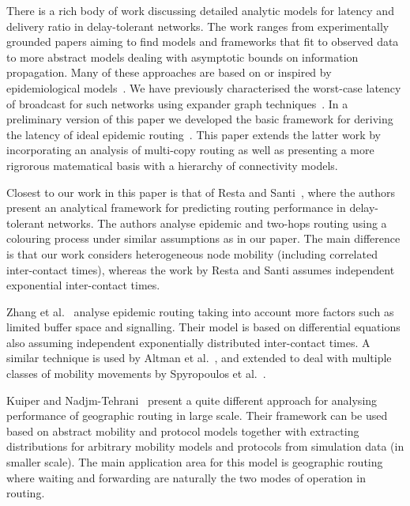 \documentclass{article}
\begin{document}
There is a rich body of work discussing detailed analytic models for
latency and delivery ratio in delay-tolerant networks. The work ranges
from experimentally grounded papers aiming to find models and
frameworks that fit to observed data to more abstract models dealing
with asymptotic bounds on information propagation. Many of these
approaches are based on or inspired by epidemiological
models~\cite{khelil02}. We have previously characterised the
worst-case latency of broadcast for such networks using expander graph
techniques~\cite{asplund12worst}. In a preliminary version of this
paper we developed the basic framework for deriving the latency of
ideal epidemic routing~\cite{asplund12analysing}. This paper extends
the latter work by incorporating an analysis of multi-copy routing as
well as presenting a more rigrorous matematical basis with a hierarchy
of connectivity models.


Closest to our work in this paper is that of Resta and
Santi~\cite{resta11}, where the authors present an analytical
framework for predicting routing performance in delay-tolerant
networks. The authors analyse epidemic and two-hops routing using a
colouring process under similar assumptions as in our paper. The main
difference is that our work considers heterogeneous node mobility
(including correlated inter-contact times), whereas the work by Resta and
Santi assumes independent exponential inter-contact times.

Zhang et al.~\cite{zhang07} analyse epidemic routing taking into
account more factors such as limited buffer space and
signalling. Their model is based on differential equations also
assuming independent exponentially distributed inter-contact times. A
similar technique is used by Altman et al.~\cite{altman10}, and
extended to deal with multiple classes of mobility movements by
Spyropoulos et al.~\cite{spyropoulos09}.

Kuiper and Nadjm-Tehrani~\cite{kuiper12framework} present a quite
different approach for analysing performance of geographic routing in
large scale. Their framework can be used based on abstract mobility
and protocol models together with extracting distributions for
arbitrary mobility models and protocols from simulation data (in
smaller scale). The main application area for this model is geographic
routing where waiting and forwarding are naturally the two modes of
operation in routing.
\end{document}
